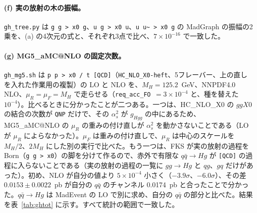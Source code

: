 \documentclass[a4paper,10pt]{ltjsarticle}
\makeatletter
\newcommand{\MGaMC}{MG5\_aMC@NLO}
\makeatother
\begin{document}
\paragraph{(f) 実の放射の木の振幅。}\texttt{gh\_tree.py} は \texttt{g g > x0 g}、\texttt{u g > x0 u}、\texttt{u u\textasciitilde{} > x0 g} の MadGraph の振幅の2乗を、(a) の4次元の式と、それぞれ3点で比べ、$7\times10^{-16}$ で一致した。

\paragraph{(g) \MGaMC{} の固定次数。}\texttt{gh\_mg5.sh} は \texttt{p p > x0 / t [QCD]}（\texttt{HC\_NLO\_X0-heft}、5フレーバー、上の直しを入れた作業用の複製）の LO と NLO を、$M_H=125.2$~GeV、NNPDF4.0 NLO、$\mu_R=\mu_F=M_H$ で走らせる（\texttt{req\_acc\_FO}~$=3\times10^{-4}$ と、種を替えた $10^{-4}$）。比べるときに分かったことが二つある。一つは、HC\_NLO\_X0 の $ggX0$ の結合の次数が \texttt{QNP} だけで、その $\alpha_s^2$ が $g_{Hgg}$ の中にあるため、\MGaMC{} の $\mu_R$ の重みの付け直しが $\alpha_s^2$ を動かさないことである（LO が $\mu_R$ によらなかった）。$\mu_F$ は重みの付け直しで、$\mu_R$ は中心のスケールを $M_H/2$、$2M_H$ にした別の実行で比べた。もう一つは、FKS が実の放射の過程を Born（\texttt{g g > x0}）の脚を分けて作るので、赤外で有限な $q\bar q\to Hg$ が \texttt{[QCD]} の過程に入らないことである（実の放射の過程の一覧に $gg\to Hg$ と $qg$、$gq$ だけがあった）。初め、NLO が自分の値より $5\times10^{-4}$ 小さく（$-3.9\sigma$、$-6.0\sigma$）、その差 $0.0153\pm0.0022$~pb が自分の $q\bar q$ のチャンネル 0.0174~pb と合ったことで分かった。$q\bar q\to Hg$ は MadEvent の LO で別に求め、自分の $q\bar q$ の部分と比べた。結果を表~\ref{tab:ghtot} に示す。すべて統計の範囲で一致した。
\end{document}
